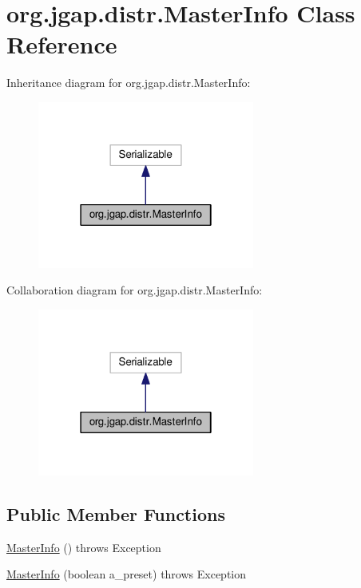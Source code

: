 \hypertarget{classorg_1_1jgap_1_1distr_1_1_master_info}{\section{org.\-jgap.\-distr.\-Master\-Info Class Reference}
\label{classorg_1_1jgap_1_1distr_1_1_master_info}
}


Inheritance diagram for org.\-jgap.\-distr.\-Master\-Info\-:
\nopagebreak
\begin{figure}[H]
\begin{center}
\leavevmode
\includegraphics[width=202pt]{classorg_1_1jgap_1_1distr_1_1_master_info__inherit__graph}
\end{center}
\end{figure}


Collaboration diagram for org.\-jgap.\-distr.\-Master\-Info\-:
\nopagebreak
\begin{figure}[H]
\begin{center}
\leavevmode
\includegraphics[width=202pt]{classorg_1_1jgap_1_1distr_1_1_master_info__coll__graph}
\end{center}
\end{figure}
\subsection*{Public Member Functions}
\begin{DoxyCompactItemize}
\item 
\hyperlink{classorg_1_1jgap_1_1distr_1_1_master_info_ae39fba47eb4db5f2252e8e2c61f02160}{Master\-Info} ()  throws Exception 
\item 
\hyperlink{classorg_1_1jgap_1_1distr_1_1_master_info_ab71d811b40ad611e2684b9376db60961}{Master\-Info} (boolean a\-\_\-preset)  throws Exception 
\end{DoxyCompactItemize}
